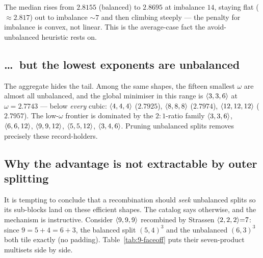 The median rises from \(2.8155\) (balanced) to \(2.8695\) at imbalance \(14\),
staying flat (\(\approx 2.817\)) out to imbalance \(\sim 7\) and then climbing
steeply --- the penalty for imbalance is convex, not linear. This is the
average-case fact the avoid-unbalanced heuristic rests on.

\subsection{\dots\ but the lowest exponents are unbalanced}
\label{ssec:omega-records}

The aggregate hides the tail. Among the same shapes, the fifteen smallest
\(\omega\) are almost all unbalanced, and the global minimiser in this range is
\(\langle 3, 3, 6 \rangle\) at \(\omega = 2.7743\) --- below \emph{every} cubic:
\(\langle 4, 4, 4 \rangle\) (\(2.7925\)), \(\langle 8, 8, 8 \rangle\) (\(2.7974\)),
\(\langle 12, 12, 12 \rangle\) (\(2.7957\)). The low-\(\omega\) frontier is dominated
by the \(2{:}1\)-ratio family \(\langle 3, 3, 6 \rangle\), \(\langle 6, 6, 12 \rangle\),
\(\langle 9, 9, 12 \rangle\), \(\langle 5, 5, 12 \rangle\), \(\langle 3, 4, 6 \rangle\).
Pruning unbalanced splits removes precisely these record-holders.

\subsection{Why the advantage is not extractable by outer splitting}
\label{ssec:omega-not-extractable}

It is tempting to conclude that a recombination should \emph{seek} unbalanced
splits so its sub-blocks land on these efficient shapes. The catalog says
otherwise, and the mechanism is instructive. Consider \(\langle 9, 9, 9 \rangle\)
recombined by Strassen \(\langle 2, 2, 2 \rangle{=}7\): since \(9 = 5+4 = 6+3\), the
balanced split \((5,4)^3\) and the unbalanced \((6,3)^3\) both tile exactly (no
padding). Table~\ref{tab:9-faceoff} puts their seven-product multisets
side by side.


